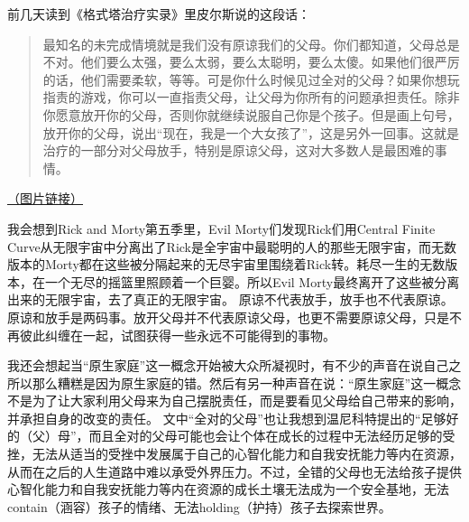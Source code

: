 前几天读到《格式塔治疗实录》里皮尔斯说的这段话：

\blockquote{最知名的未完成情境就是我们没有原谅我们的父母。你们都知道，父母总是不对。他们要么太强，要么太弱，要么太聪明，要么太傻。如果他们很严厉的话，他们需要柔软，等等。可是你什么时候见过全对的父母？如果你想玩指责的游戏，你可以一直指责父母，让父母为你所有的问题承担责任。除非你愿意放开你的父母，否则你就继续说服自己你是个孩子。但是画上句号，放开你的父母，说出“现在，我是一个大女孩了”，这是另外一回事。这就是治疗的一部分\pozhehao{}对父母放手，特别是原谅父母，这对大多数人是最困难的事情。}

\href{https://mmbiz.qpic.cn/mmbiz\_jpg/IGJaLSh5ibibPezYLTeAPJTcIvTFjf4qcpy88tQokV4sfu9Y6ojXXSWlyld73T3L5ZlwibGGUUCQ3PkpdLv0cueMg/640?wx\_fmt=jpeg\&wxfrom=5\&wx\_lazy=1\&wx\_co=1}{（图片链接）}

我会想到Rick and Morty第五季里，Evil Morty们发现Rick们用Central Finite Curve从无限宇宙中分离出了Rick是全宇宙中最聪明的人的那些无限宇宙，而无数版本的Morty都在这些被分隔起来的无尽宇宙里围绕着Rick转。耗尽一生的无数版本，在一个无尽的摇篮里照顾着一个巨婴。所以Evil Morty最终离开了这些被分离出来的无限宇宙，去了真正的无限宇宙。
原谅不代表放手，放手也不代表原谅。原谅和放手是两码事。放开父母并不代表原谅父母，也更不需要原谅父母，只是不再彼此纠缠在一起，试图获得一些永远不可能得到的事物。

我还会想起当“原生家庭”这一概念开始被大众所凝视时，有不少的声音在说自己之所以那么糟糕是因为原生家庭的错。然后有另一种声音在说：“原生家庭”这一概念不是为了让大家利用父母来为自己摆脱责任，而是要看见父母给自己带来的影响，并承担自身的改变的责任。
文中“全对的父母”也让我想到温尼科特提出的“足够好的（父）母”，而且全对的父母可能也会让个体在成长的过程中无法经历足够的受挫，无法从适当的受挫中发展属于自己的心智化能力和自我安抚能力等内在资源，从而在之后的人生道路中难以承受外界压力。不过，全错的父母也无法给孩子提供心智化能力和自我安抚能力等内在资源的成长土壤\pozhehao{}无法成为一个安全基地，无法contain（涵容）孩子的情绪、无法holding（护持）孩子去探索世界。

